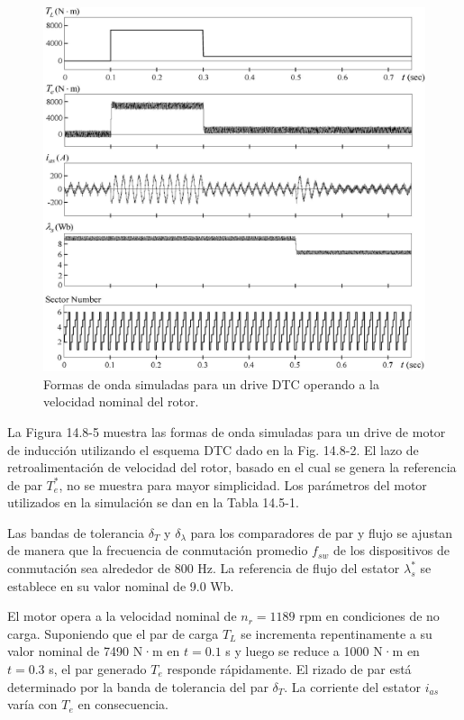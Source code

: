 \documentclass[letterpaper,12pt]{article}
\begin{document}
\begin{figure}[ht]
\centering
\includegraphics{graficos/img27.jpg}
\caption{Formas de onda simuladas para un drive DTC operando a la velocidad nominal del rotor.}
\label{fig:14.8-5}
\end{figure}
\FloatBarrier

La Figura 14.8-5 muestra las formas de onda simuladas para un drive de motor de inducción utilizando el esquema DTC dado en la Fig. 14.8-2. El lazo de retroalimentación de velocidad del rotor, basado en el cual se genera la referencia de par $T_e^*$, no se muestra para mayor simplicidad. Los parámetros del motor utilizados en la simulación se dan en la Tabla 14.5-1.

Las bandas de tolerancia $\delta_T$ y $\delta_\lambda$ para los comparadores de par y flujo se ajustan de manera que la frecuencia de conmutación promedio $f_{sw}$ de los dispositivos de conmutación sea alrededor de 800 Hz. La referencia de flujo del estator $\lambda_s^*$ se establece en su valor nominal de 9.0 Wb.

El motor opera a la velocidad nominal de $n_r = 1189$ rpm en condiciones de no carga. Suponiendo que el par de carga $T_L$ se incrementa repentinamente a su valor nominal de 7490 N·m en $t = 0.1$ s y luego se reduce a 1000 N·m en $t = 0.3$ s, el par generado $T_e$ responde rápidamente. El rizado de par está determinado por la banda de tolerancia del par $\delta_T$. La corriente del estator $i_{as}$ varía con $T_e$ en consecuencia.
\end{document}
